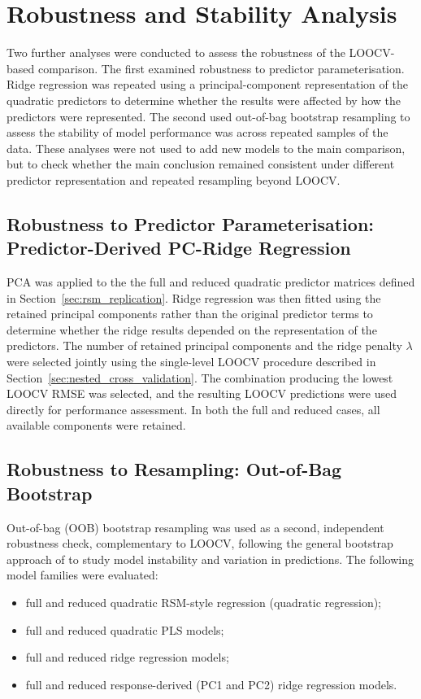 \documentclass[MScDSA]{uccthesis}
\begin{document}
\section{Robustness and Stability Analysis}
\label{sec:robustness_analysis}
Two further analyses were conducted to assess the robustness of the LOOCV-based comparison. The first examined robustness to predictor parameterisation. Ridge regression was repeated using a principal-component representation of the quadratic predictors to determine whether the results were affected by how the predictors were represented. The second used out-of-bag bootstrap resampling to assess the stability of model performance was across repeated samples of the data. These analyses were not used to add new models to the main comparison, but to check whether the main conclusion remained consistent under different predictor representation and repeated resampling beyond LOOCV.


\subsection{Robustness to Predictor Parameterisation: Predictor-Derived PC-Ridge Regression}
\label{sec:parameterisation_robustness}
PCA was applied to the the full and reduced quadratic predictor matrices defined in Section~\ref{sec:rsm_replication}. Ridge regression was then fitted using the retained principal components rather than the original predictor terms to determine whether the ridge results depended on the representation of the predictors.
The number of retained principal components and the ridge penalty $\lambda$ were selected jointly using the single-level LOOCV procedure described in Section~\ref{sec:nested_cross_validation}. The combination producing the lowest LOOCV RMSE was selected, and the resulting LOOCV predictions were used directly for performance assessment. In both the full and reduced cases, all available components were retained.


\subsection{Robustness to Resampling: Out-of-Bag Bootstrap}
\label{sec:bootstrap_resampling}
Out-of-bag (OOB) bootstrap resampling was used as a second, independent robustness check, complementary to LOOCV, following the general bootstrap approach of \parencite{Efron:1979} to study model instability and variation in predictions. The following model families were evaluated:
\begin{itemize}
    \item full and reduced quadratic RSM-style regression (quadratic regression);
    \item full and reduced quadratic PLS models;
    \item full and reduced ridge regression models;
    \item full and reduced response-derived (PC1 and PC2) ridge regression models.
\end{itemize}
\end{document}
